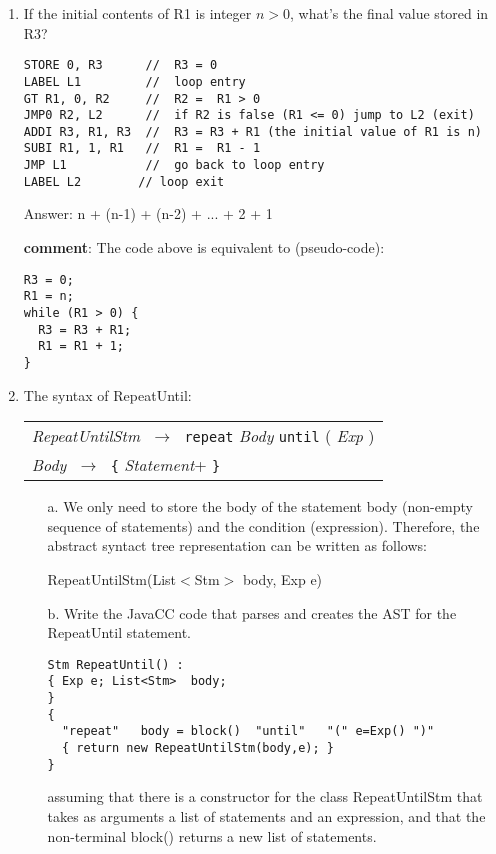\documentclass{article}
\newcommand{\regla}[1]{$\;\mathbf{\stackrel{{}_{#1}}{\longrightarrow}}\;$}
\newcommand{\comment}{\textbf{comment}}
\begin{document}
\begin{enumerate}
\item If the initial contents of R1 is integer $n > 0$, what's the final value stored in R3?

\begin{verbatim}
STORE 0, R3      //  R3 = 0
LABEL L1         //  loop entry
GT R1, 0, R2     //  R2 =  R1 > 0
JMP0 R2, L2      //  if R2 is false (R1 <= 0) jump to L2 (exit)
ADDI R3, R1, R3  //  R3 = R3 + R1 (the initial value of R1 is n)
SUBI R1, 1, R1   //  R1 =  R1 - 1
JMP L1           //  go back to loop entry
LABEL L2        // loop exit
\end{verbatim}

Answer: n + (n-1) + (n-2) + ... + 2 + 1

\comment: The code above is equivalent to (pseudo-code):

\begin{verbatim}
R3 = 0;
R1 = n;
while (R1 > 0) {
  R3 = R3 + R1;
  R1 = R1 + 1;
}
\end{verbatim}


\item The syntax of RepeatUntil:

 \begin{tabular}{l}
\textit{RepeatUntilStm} \regla{} \verb+repeat+ \textit{Body} \verb+until+ ( \textit{Exp} )  \\
\textit{Body} \regla{} \verb+{+ \textit{Statement}+ \verb+}+
\end{tabular}

\begin{itemize}

\item[a.] We only need to store the body of the statement body (non-empty sequence of statements) and the condition (expression). Therefore, the abstract syntact tree representation can be written as follows:

RepeatUntilStm(List$<$Stm$>$ body, Exp e)


\item[b.] Write the JavaCC code that parses and creates the AST for the RepeatUntil statement.

\begin{verbatim}
Stm RepeatUntil() :
{ Exp e; List<Stm>  body; 
}
{
  "repeat"   body = block()  "until"   "(" e=Exp() ")"
  { return new RepeatUntilStm(body,e); }
}
\end{verbatim}

assuming that there is a constructor for the class RepeatUntilStm that takes as arguments a list of statements and an expression, and that the non-terminal block() returns a new list of statements.



\end{itemize}
\end{enumerate}
\end{document}
